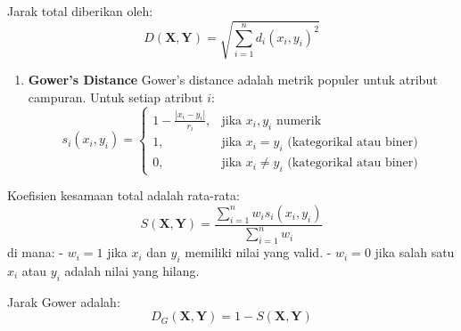 \documentclass[
  oneside]{book}
\providecommand{\tightlist}{%
  \setlength{\itemsep}{0pt}\setlength{\parskip}{0pt}}
\begin{document}
Jarak total diberikan oleh: \[
D(\mathbf{X}, \mathbf{Y}) = \sqrt{\sum_{i=1}^n d_i(x_i, y_i)^2}
\]

\begin{enumerate}
\def\labelenumi{\arabic{enumi}.}
\setcounter{enumi}{1}
\tightlist
\item
  \textbf{Gower's Distance} Gower's distance adalah metrik populer untuk atribut campuran. Untuk setiap atribut \(i\): \[
  s_i(x_i, y_i) =
  \begin{cases} 
  1 - \frac{|x_i - y_i|}{r_i}, & \text{jika } x_i, y_i \text{ numerik} \\
  1, & \text{jika } x_i = y_i \text{ (kategorikal atau biner)} \\
  0, & \text{jika } x_i \neq y_i \text{ (kategorikal atau biner)} 
  \end{cases}
  \]
\end{enumerate}

Koefisien kesamaan total adalah rata-rata:
\[
S(\mathbf{X}, \mathbf{Y}) = \frac{\sum_{i=1}^n w_i s_i(x_i, y_i)}{\sum_{i=1}^n w_i}
\] di mana: - \(w_i = 1\) jika \(x_i\) dan \(y_i\) memiliki nilai yang valid. - \(w_i = 0\) jika salah satu \(x_i\) atau \(y_i\) adalah nilai yang hilang.

Jarak Gower adalah:
\[
D_G(\mathbf{X}, \mathbf{Y}) = 1 - S(\mathbf{X}, \mathbf{Y})
\]
\end{document}
